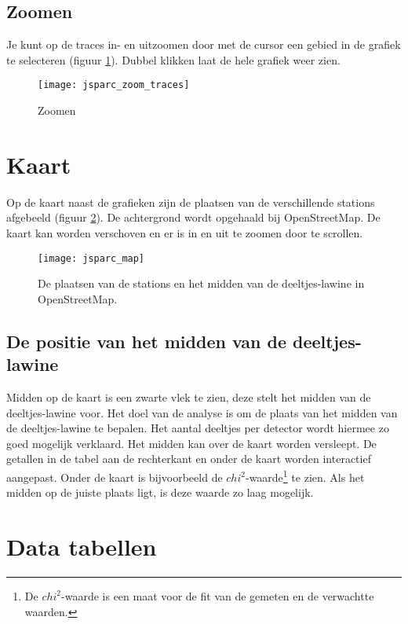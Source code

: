 \subsection{Zoomen}

Je kunt op de traces in- en uitzoomen door met de cursor een gebied in de 
grafiek te selecteren (figuur \ref{fig:zoomen}). Dubbel klikken laat de hele grafiek weer zien.

\begin{figure}[H]
    \centering
    \texttt{[image: jsparc\_zoom\_traces]}
    \caption{Zoomen}
    \label{fig:zoomen}
\end{figure}

\section{Kaart}

Op de kaart naast de grafieken zijn de plaatsen van de verschillende \hisparc stations
afgebeeld (figuur \ref{fig:core}). De achtergrond wordt opgehaald bij OpenStreetMap. De kaart kan 
worden verschoven en er is in en uit te zoomen door te scrollen.

\begin{figure}[H]
    \centering
    \texttt{[image: jsparc\_map]}
    \caption{De plaatsen van de stations en het midden van de deeltjes-lawine in OpenStreetMap.}
    \label{fig:core}
\end{figure}

\subsection{De positie van het midden van de deeltjes-lawine}

Midden op de kaart is een zwarte vlek te zien, deze stelt het midden van de 
deeltjes-lawine voor. Het doel van de analyse is om de plaats van het midden 
van de deeltjes-lawine te bepalen. Het aantal deeltjes per detector wordt 
hiermee zo goed mogelijk verklaard. Het midden kan over de kaart worden 
versleept. De getallen in de tabel aan de rechterkant en onder de kaart worden 
interactief aangepast. Onder de kaart is bijvoorbeeld de $chi^{2}$-waarde\footnote{De $chi^{2}$-waarde is een maat voor de fit van de gemeten en de verwachtte waarden.} 
te zien. Als het midden op de juiste plaats ligt, is deze waarde zo laag 
mogelijk.


\section{Data tabellen}

